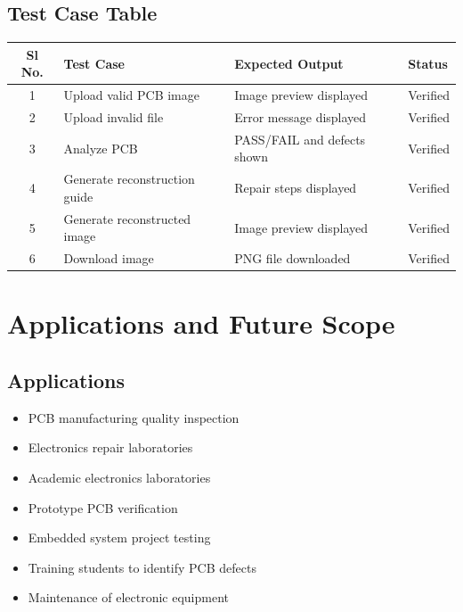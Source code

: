 \documentclass[12pt,a4paper]{report}
\begin{document}
\section{Test Case Table}

\begin{longtable}{|c|p{4cm}|p{5cm}|p{3cm}|}

\hline
\textbf{Sl No.} & \textbf{Test Case} & \textbf{Expected Output} & \textbf{Status} \\
\hline

1 & Upload valid PCB image & Image preview displayed & Verified \\
\hline

2 & Upload invalid file & Error message displayed & Verified \\
\hline

3 & Analyze PCB & PASS/FAIL and defects shown & Verified \\
\hline

4 & Generate reconstruction guide & Repair steps displayed & Verified \\
\hline

5 & Generate reconstructed image & Image preview displayed & Verified \\
\hline

6 & Download image & PNG file downloaded & Verified \\
\hline

\end{longtable}


\chapter{Applications and Future Scope}

\section{Applications}

\begin{itemize}

\item PCB manufacturing quality inspection
\item Electronics repair laboratories
\item Academic electronics laboratories
\item Prototype PCB verification
\item Embedded system project testing
\item Training students to identify PCB defects
\item Maintenance of electronic equipment

\end{itemize}
\end{document}

